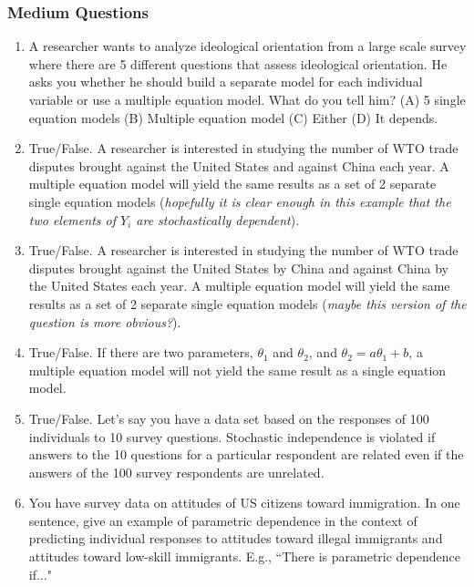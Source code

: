 \documentclass[11pt]{article}
\begin{document}
\subsubsection{Medium Questions}
\begin{enumerate}
\item A researcher wants to analyze ideological orientation from a large scale survey where there are 5 different questions that assess ideological orientation. He asks you whether he should build a separate model for each individual variable or use a multiple equation model. What do you tell him? (A) 5 single equation models (B) Multiple equation model (C) Either (D) It depends.
\item True/False. A researcher is interested in studying the number of WTO trade disputes brought against the United States and against China each year. A multiple equation model will yield the same results as a set of 2 separate single equation models (\emph{hopefully it is clear enough in this example that the two elements of $Y_i$ are stochastically dependent}). %
\item True/False. A researcher is interested in studying the number of WTO trade disputes brought against the United States by China and against China by the United States each year. A multiple equation model will yield the same results as a set of 2 separate single equation models (\emph{maybe this version of the question is more obvious?}). %
\item True/False. If there are two parameters, $\theta_1$ and $\theta_2$, and $\theta_2 = a\theta_1 + b$, a multiple equation model will not yield the same result as a single equation model.
\item True/False. Let's say you have a data set based on the responses of 100 individuals to 10 survey questions. Stochastic independence is violated if answers to the 10 questions for a particular respondent are related even if the answers of the 100 survey respondents are unrelated. 
\item You have survey data on attitudes of US citizens toward immigration. In one sentence, give an example of parametric dependence in the context of predicting individual responses to attitudes toward illegal immigrants and attitudes toward low-skill immigrants. E.g., ``There is parametric dependence if..." 

\end{enumerate}
\end{document}

